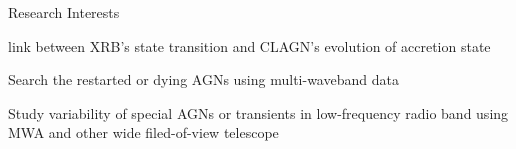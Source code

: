 \prefix{}
\begin{rubric}{Research Interests}

	{\large link between XRB's state transition and CLAGN's evolution of accretion state \par}
	



    {\large Search the restarted or dying AGNs using multi-waveband data \par}
	
    {\large Study variability of special AGNs or transients in low-frequency radio band using MWA and other wide filed-of-view telescope \par}

	
	

\end{rubric}